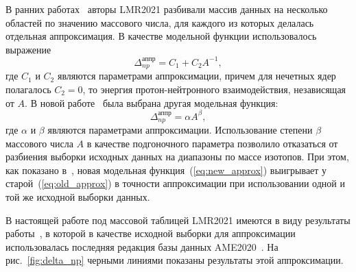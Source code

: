 В ранних работах~\cite{vladimirova2021-1,vladimirova2021-2} авторы LMR2021 разбивали массив данных на несколько областей по значению массового числа, для каждого из которых делалась отдельная аппроксимация. В качестве модельной функции использовалось выражение
\begin{equation}
\Delta^\text{аппр}_{np} = C_1 + C_2 A^{-1},
\label{eq:old_approx}
\end{equation}
где $C_1$ и $C_2$ являются параметрами аппроксимации, причем для нечетных ядер полагалось $C_2 = 0$, то энергия протон-нейтронного взаимодействия, независящая от $A$. В новой работе~\cite{vladimirova2022} была выбрана другая модельная функция:
\begin{equation}
\Delta^\text{аппр}_{np} = \alpha A^{\beta},
\label{eq:new_approx}
\end{equation}
где $\alpha$ и $\beta$ являются параметрами аппроксимации. Использование степени $\beta$ массового числа $A$ в качестве подгоночного параметра позволило отказаться от разбиения выборки исходных данных на диапазоны по массе изотопов. При этом, как показано в~\cite{vladimirova2022}, новая модельная функция~(\ref{eq:new_approx}) выигрывает у старой~(\ref{eq:old_approx}) в точности аппроксимации при использовании одной и той же исходной выборки данных.

В настоящей работе под массовой таблицей LMR2021 имеются в виду результаты работы~\cite{vladimirova2022}, в которой в качестве исходной выборки для аппроксимации использовалась последняя редакция базы данных AME2020~\cite{huang2021}. На рис.~\ref{fig:delta_np} черными линиями показаны результаты этой аппроксимации.

